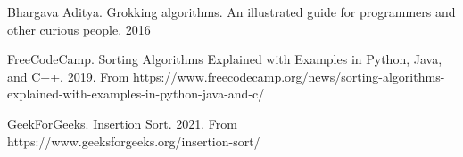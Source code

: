 
\begin{thebibliography}{X}
   Bhargava Aditya. Grokking algorithms. An illustrated
                      guide for programmers and other curious people. 2016

   FreeCodeCamp. Sorting Algorithms Explained
                      with Examples in Python, Java, and C++. 2019. From
                      https://www.freecodecamp.org/news/sorting-algorithms-
                      explained-with-examples-in-python-java-and-c/

   GeekForGeeks. Insertion Sort. 2021. From
                      https://www.geeksforgeeks.org/insertion-sort/


\end{thebibliography}

